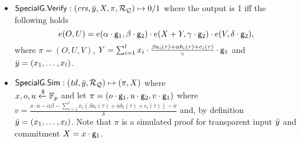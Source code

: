 \begin{definition}
\begin{itemize}
\item ${\mathsf{SpecialG}}.{\mathsf{Verify}}: (\mathit{crs}, \bar{y}, X, \pi, \mathcal{R}_{\mathcal{Q}}) \mapsto 0/1$ where the output is 1 iff the following holds 
$$e(O,U) = e(\alpha \cdot \mathsf{g}_1, \beta \cdot \mathsf{g}_2) \cdot e(X + Y, \gamma \cdot \mathsf{g}_2) \cdot e(V, \delta \cdot \mathsf{g}_2),$$
where $\pi = (O, U, V)$, $Y = \sum_{i=1}^{l} x_i \cdot \frac{\beta a_i(\tau)+ \alpha b_i(\tau)+ c_i(\tau)}{\gamma}  \cdot \mathsf{g}_1$ 
and $\bar{y} = (x_1, \ldots, x_l)$.

\item ${\mathsf{SpecialG}}.{\mathsf{Sim}}: (\mathit{td}, \bar{y}, \mathcal{R}_{\mathcal{Q}}) \mapsto (\pi, X)$ where \\ $x, o, u \xleftarrow {\$} \mathbb{F}_p$ and let 
$\pi = (o \cdot \mathsf{g}_1, u  \cdot \mathsf{g}_2 , v \cdot \mathsf{g}_1)$ where \\ $v = \frac{o\cdot u - \alpha \beta - \sum_{i=1}^{l} x_i (\beta a_i(\tau)+ \alpha b_i(\tau)+ c_i(\tau))- x}{\delta}  $ and, 
by definition $\bar{y} = (x_1, \ldots, x_l)$. Note that $\pi$ is a simulated proof for transparent input $\bar{y}$ 
and commitment $X = x \cdot \mathsf{g}_1$.
\end{itemize} 
\end{definition}

\begin{comment}
\noindent \paragraph{Notes:} First, the trusted setup required by \SpecialG is 
an extension of that required by original Groth16~\cite{Groth16} by two additional 
group elements $\Kgamma = [\frac{\eta}{\gamma}]_1$ and $\Kdelta = [\frac{\eta}{\delta}]_1$. 
An identical trusted setup to that used by \SpecialG was also used in LegoSNARK~\cite[Fig.~22]{LegoSNARK} which defines 
a commit-carrying SNARK based on Groth16. Second, our $\SpecialG.\Reprove$ algorithm uses a Groth16 re-randomisation 
technique for the proof (see~\cite[Fig.~1]{RandomizationGroth16} or LegoSNARK~\cite[Fig.~22]{LegoSNARK}), 
but, in addition, $\SpecialG.\Reprove$ also re-randomises $X$ which is a commitment to a slice of the public input; moreover, in terms of security 
properties, we appropriately define the zero-knowledge for zk continuations such that even after iteratively applying 
$\SpecialG.\Reprove$ zero-knowledge property is preserved for both the witness as well as the public input committed to in $X$.  \\
\end{comment}


